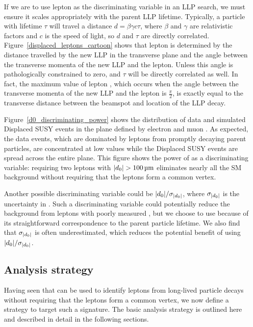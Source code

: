 If we are to use lepton \ad as the discriminating variable in an LLP search, we must ensure it scales appropriately with the parent LLP lifetime. Typically, a particle with lifetime $\tau$ will travel a distance $d=\beta\gamma c \tau$, where $\beta$ and $\gamma$ are relativistic factors and $c$ is the speed of light, so $d$ and $\tau$ are directly correlated. Figure~\ref{displaced_leptons_cartoon} shows that lepton \ad is determined by the distance travelled by the new LLP in the transverse plane and the angle between the transverse momenta of the new LLP and the lepton. Unless this angle is pathologically constrained to zero, \ad and $\tau$ will be directly correlated as well. In fact, the maximum value of lepton \ad, which occurs when the angle between the transverse momenta of the new LLP and the lepton is $\frac{\pi}{2}$, is exactly equal to the transverse distance between the beamspot and location of the LLP decay.

Figure~\ref{d0_discriminating_power} shows the distribution of data and simulated Displaced SUSY events in the plane defined by electron and muon \ad. As expected, the data events, which are dominated by leptons from promptly decaying parent particles, are concentrated at low \ad values while the Displaced SUSY events are spread across the entire plane. This figure shows the power of \ad as a discriminating variable: requiring two leptons with $\ad>\SI{100}{\um}$ eliminates nearly all the SM background without requiring that the leptons form a common vertex.



Another possible discriminating variable could be $\lvert d_0 \rvert/\sigma_{\lvert d_0 \rvert}$, where $\sigma_{\lvert d_0 \rvert}$ is the uncertainty in \ad. Such a discriminating variable could potentially reduce the background from leptons with poorly measured \ad, but we choose to use \ad because of its straightforward correspondence to the parent particle lifetime. We also find that $\sigma_{\lvert d_0 \rvert}$ is often underestimated, which reduces the potential benefit of using $\lvert d_0 \rvert/\sigma_{\lvert d_0 \rvert}$.

\subsection{Analysis strategy}
Having seen that \ad can be used to identify leptons from long-lived particle decays without requiring that the leptons form a common vertex, we now define a strategy to target such a signature. The basic analysis strategy is outlined here and described in detail in the following sections.

